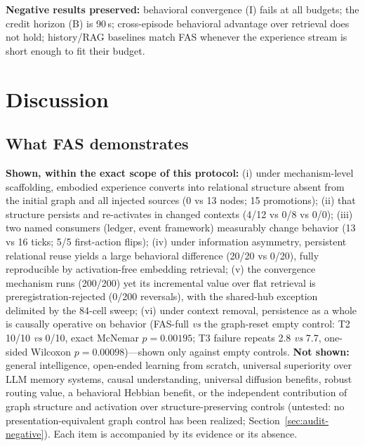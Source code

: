 \documentclass[10pt]{article}
\begin{document}
\textbf{Negative results preserved:} behavioral convergence (I) fails
at all budgets; the credit horizon (B) is 90\,s; cross-episode
behavioral advantage over retrieval does not hold; history/RAG
baselines match FAS whenever the experience stream is short enough to
fit their budget.

\section{Discussion}
\label{sec:discussion}

\subsection{What FAS demonstrates}
\textbf{Shown, within the exact scope of this protocol:} (i) under mechanism-level scaffolding, embodied experience converts into relational structure absent from the initial graph and all injected sources (0 vs 13 nodes; 15 promotions); (ii) that structure persists and re-activates in changed contexts (4/12 vs 0/8 vs 0/0); (iii) two named consumers (ledger, event framework) measurably change behavior (13 vs 16 ticks; 5/5 first-action flips); (iv) under information asymmetry, persistent relational reuse yields a large behavioral difference (20/20 vs 0/20), fully reproducible by activation-free embedding retrieval; (v) the convergence mechanism runs (200/200) yet its incremental value over flat retrieval is preregistration-rejected (0/200 reversals), with the shared-hub exception delimited by the 84-cell sweep; (vi) under context removal, persistence as a whole is causally operative on behavior (FAS-full \emph{vs} the graph-reset empty control: T2 10/10 \emph{vs} 0/10, exact McNemar $p{=}0.00195$; T3 failure repeats 2.8 \emph{vs} 7.7, one-sided Wilcoxon $p{=}0.00098$)---shown only against empty controls. \textbf{Not shown:} general intelligence, open-ended learning from scratch, universal superiority over LLM memory systems, causal understanding, universal diffusion benefits, robust routing value, a behavioral Hebbian benefit, or the independent contribution of graph structure and activation over structure-preserving controls (untested: no presentation-equivalent graph control has been realized; Section~\ref{sec:audit-negative}). Each item is accompanied by its evidence or its absence.
\end{document}
